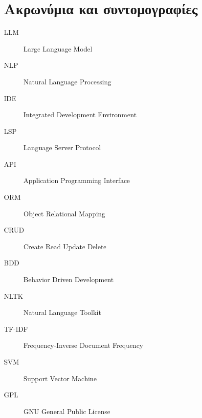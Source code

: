 \chapter{Ακρωνύμια και συντομογραφίες}

\begin{description}
\item[LLM]
  Large Language Model
\item[NLP]
  Natural Language Processing
\item[IDE]
  Integrated Development Environment
\item[LSP]
  Language Server Protocol
\item[API]
  Application Programming Interface
\item[ORM]
  Object Relational Mapping
\item[CRUD]
  Create Read Update Delete
\item[BDD]
  Behavior Driven Development
\item[NLTK]
  Natural Language Toolkit
\item[TF-IDF]
  Frequency-Inverse Document Frequency
\item[SVM]
  Support Vector Machine
\item[GPL]
  GNU General Public License
\end{description}
